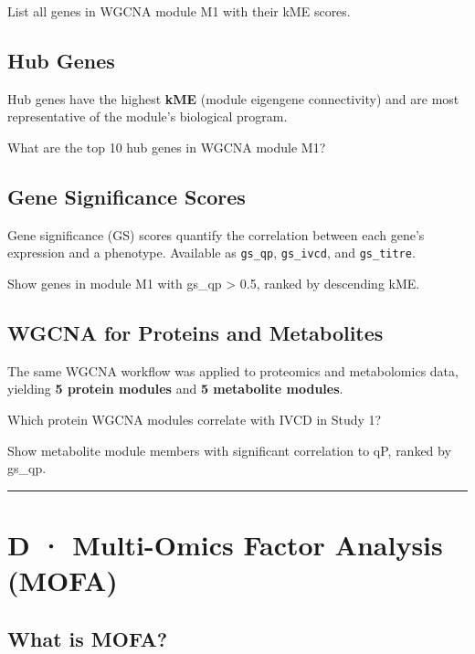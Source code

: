 \documentclass[
  letterpaper,
  oneside,
  open=any]{scrbook}
\begin{document}
List all genes in WGCNA module M1 with their kME scores.

\subsection{Hub Genes}\label{hub-genes}

Hub genes have the highest \textbf{kME} (module eigengene connectivity)
and are most representative of the module's biological program.

What are the top 10 hub genes in WGCNA module M1?

\subsection{Gene Significance Scores}\label{gene-significance-scores}

Gene significance (GS) scores quantify the correlation between each
gene's expression and a phenotype. Available as \texttt{gs\_qp},
\texttt{gs\_ivcd}, and \texttt{gs\_titre}.

Show genes in module M1 with gs\_qp \textgreater{} 0.5, ranked by
descending kME.

\subsection{WGCNA for Proteins and
Metabolites}\label{wgcna-for-proteins-and-metabolites}

The same WGCNA workflow was applied to proteomics and metabolomics data,
yielding \textbf{5 protein modules} and \textbf{5 metabolite modules}.

Which protein WGCNA modules correlate with IVCD in Study 1?

Show metabolite module members with significant correlation to qP,
ranked by gs\_qp.

\begin{center}\rule{0.5\linewidth}{0.5pt}\end{center}

\section{D · Multi-Omics Factor Analysis (MOFA)}\label{sec-mofa}

\subsection{What is MOFA?}\label{what-is-mofa}
\end{document}
